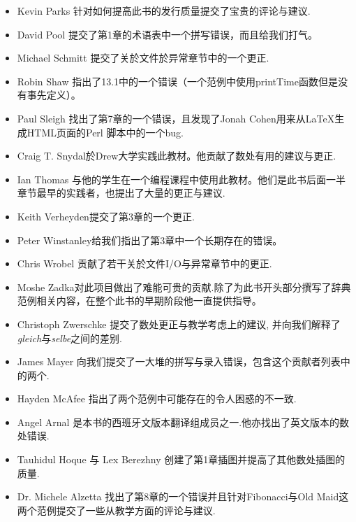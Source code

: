 \begin{itemize}
\item Kevin Parks 针对如何提高此书的发行质量提交了宝贵的评论与建议.

\item David Pool 提交了第1章的术语表中一个拼写错误，而且给我们打气。

\item Michael Schmitt 提交了关於文件於异常章节中的一个更正.

\item Robin Shaw 指出了13.1中的一个错误（一个范例中使用printTime函数但是没有事先定义）。

\item Paul Sleigh 找出了第7章的一个错误，且发现了Jonah Cohen用来从LaTeX生成HTML页面的Perl 脚本中的一个bug.

\item Craig T. Snydal於Drew大学实践此教材。他贡献了数处有用的建议与更正. 

\item Ian Thomas 与他的学生在一个编程课程中使用此教材。他们是此书后面一半章节最早的实践者，也提出了大量的更正与建议.

\item Keith Verheyden提交了第3章的一个更正.

\item Peter Winstanley给我们指出了第3章中一个长期存在的错误。

\item Chris Wrobel 贡献了若干关於文件I/O与异常章节中的更正. 

\item Moshe Zadka对此项目做出了难能可贵的贡献.除了为此书开头部分撰写了辞典范例相关内容，在整个此书的早期阶段他一直提供指导。

\item Christoph Zwerschke 提交了数处更正与教学考虑上的建议, 并向我们解释了{\em gleich}与{\em selbe}之间的差别.

\item James Mayer 向我们提交了一大堆的拼写与录入错误，包含这个贡献者列表中的两个.

\item Hayden McAfee 指出了两个范例中可能存在的令人困惑的不一致.

\item Angel Arnal 是本书的西班牙文版本翻译组成员之一.他亦找出了英文版本的数处错误.

\item Tauhidul Hoque 与 Lex Berezhny 创建了第1章插图并提高了其他数处插图的质量.

\item Dr. Michele Alzetta 找出了第8章的一个错误并且针对Fibonacci与Old Maid这两个范例提交了一些从教学方面的评论与建议.


\end{itemize}
